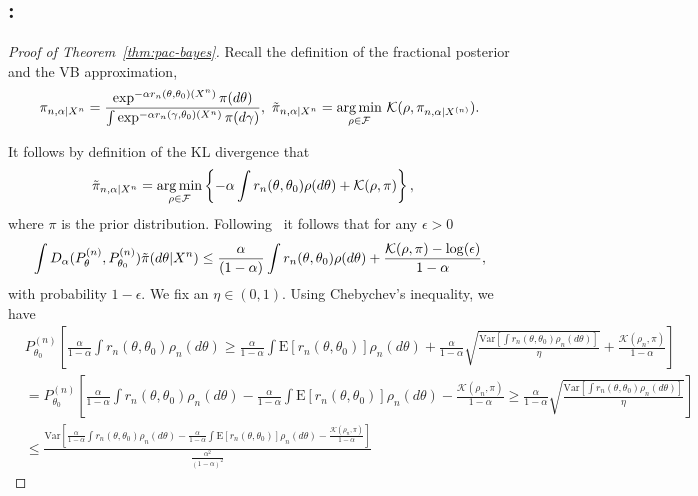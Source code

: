 \documentclass[11pt]{amsart}
\newcommand{\E}{\mathrm{E}}
\newcommand{\Var}{\mathrm{Var}}
\newcommand{\loglik}{r_n(\theta,\theta_0)}
\newcommand{\malpharen}{D_{\alpha}(P^{(n)}_{\theta},P^{(n)}_{\theta_0})}
\newcommand{\data}{X_0,\dots,X_n}
\begin{document}
\subsection{\bf {}:}
\begin{proof}[Proof of Theorem~\ref{thm:pac-bayes}]
Recall the definition of the fractional posterior and the VB approximation,
\begin{align*}
      \pi_{n,\alpha|X^n} =\frac{\exp^{-\alpha r_n (\theta,\theta_0)(X^n)}\pi(d\theta)}{\int \exp^{-\alpha r_n (\gamma,\theta_0)(X^n)}\pi(d\gamma)},~
      \Tilde{\pi}_{n,\alpha|X^n} =\underset{\mathcal{\rho \in F}}{\arg \min}~ \mathcal{K}(\rho,\pi_{n,\alpha|X^{(n)}}).
\end{align*}

It follows by definition of the KL divergence that
\begin{align}
    \Tilde{\pi}_{n,\alpha|X^n} & =\underset{\mathcal{\rho \in F}}{\arg \min}\left\{ -\alpha \int \loglik \rho(d\theta) +\mathcal{K}(\rho,\pi) \right\},
\end{align}
where $\pi$ is the prior distribution. 
%
Following~ it follows that for any $\epsilon > 0$ 
\begin{equation*} 
\int\malpharen {\Tilde{\pi}(d\theta|X^n)}\leq\frac{\alpha}{(1-\alpha)} \int\loglik\rho(d\theta)+\frac{\mathcal{K}(\rho,\pi) - \log(\epsilon)}{1-\alpha},
\end{equation*}
with probability $1-\epsilon$. 
We fix an $\eta \in (0,1)$.  
Using Chebychev's inequality, we have
\begin{align*}
  & P_{\theta_0}^{(n)}\left[ \frac{\alpha}{1-\alpha} \int \loglik\rho_n(d\theta) \geq  \frac{\alpha}{1-\alpha}\int \E[\loglik]\rho_n(d\theta)+\frac{\alpha}{1-\alpha} 
    \sqrt{ \frac{\Var[\int \loglik \rho_n(d\theta)]}{\eta} } +\frac{\mathcal{K}(\rho_n,\pi)}{1-\alpha} \right] \\
 &= P_{\theta_0}^{(n)}\left[ \frac{\alpha}{1-\alpha} \int \loglik\rho_n(d\theta) -  \frac{\alpha}{1-\alpha} \int \E[\loglik]\rho_n(d\theta) - \frac{\mathcal{K}(\rho_n,\pi)}{1-\alpha}  \geq 
   \frac{\alpha}{1-\alpha}
\sqrt{ \frac{\Var[\int \loglik \rho_n(d\theta)]}{\eta} }\right]\\
  & \leq \frac{\Var\left[ \frac{\alpha}{1-\alpha} \int \loglik\rho_n(d\theta) -  \frac{\alpha}{1-\alpha}\int \E[\loglik]\rho_n(d\theta) - 
 \frac{\mathcal{K}(\rho_n,\pi)}{1-\alpha}    \right]}{\frac{\alpha^2}{(1-\alpha)^2}
}
\end{align*}
\end{proof}
\end{document}
